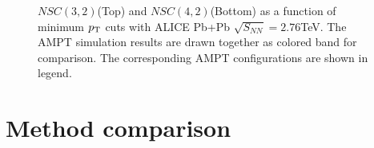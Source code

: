 	\begin{figure}[p]
		\begin{center}
           \caption{$NSC(3,2)$(Top) and $NSC(4,2)$(Bottom) as a function of minimum $p_{\rm{T}}$ cuts with ALICE Pb+Pb $\sqrt{S_{NN}}=2.76$TeV. The AMPT simulation results are drawn together as colored band for comparison. The corresponding AMPT configurations are shown in legend.}
        \label{fig:SC_xpt}
        \end{center}   
     \end{figure}
\clearpage



\section{Method comparison}


